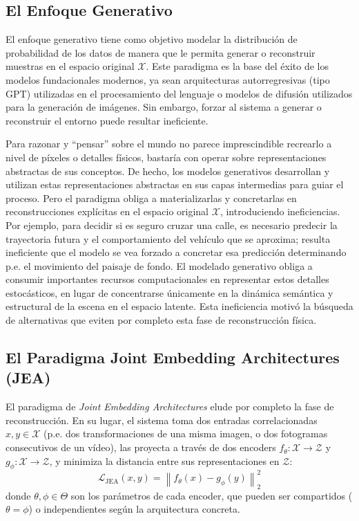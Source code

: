 \subsection{El Enfoque Generativo}
\label{subsec:generativo}
El enfoque generativo tiene como objetivo modelar la distribución de probabilidad de los datos de manera que le permita generar o reconstruir muestras en el espacio original $\mathcal{X}$. Este paradigma es la base del éxito de los modelos fundacionales modernos, ya sean arquitecturas autorregresivas (tipo GPT) utilizadas en el procesamiento del lenguaje o modelos de difusión utilizados para la generación de imágenes. Sin embargo, forzar al sistema a generar o reconstruir el entorno puede resultar ineficiente. 

Para razonar y ``pensar'' sobre el mundo no parece imprescindible recrearlo a nivel de píxeles o detalles físicos, bastaría con operar sobre representaciones abstractas de sus conceptos. De hecho, los modelos generativos desarrollan y utilizan estas representaciones abstractas en sus capas intermedias para guiar el proceso. Pero el paradigma obliga a materializarlas y concretarlas en reconstrucciones explícitas en el espacio original $\mathcal{X}$, introduciendo ineficiencias. Por ejemplo, para decidir si es seguro cruzar una calle, es necesario predecir la trayectoria futura y el comportamiento del vehículo que se aproxima; resulta ineficiente que el modelo se vea forzado a concretar esa predicción determinando p.e. el movimiento del paisaje de fondo. El modelado generativo obliga a consumir importantes recursos computacionales en representar estos detalles estocásticos, en lugar de concentrarse únicamente en la dinámica semántica y estructural de la escena en el espacio latente. Esta ineficiencia motivó la búsqueda de alternativas que eviten por completo esta fase de reconstrucción física.

\subsection{El Paradigma Joint Embedding Architectures (JEA)}
El paradigma de \textit{Joint Embedding Architectures} elude por completo la fase de reconstrucción. En su lugar, el sistema toma dos entradas correlacionadas $x, y \in \mathcal{X}$ (p.e. dos transformaciones de una misma imagen, o dos fotogramas consecutivos de un vídeo), las proyecta a través de dos encoders $f_{\theta}: \mathcal{X} \to \mathcal{Z}$ y $g_{\phi}: \mathcal{X} \to \mathcal{Z}$, y minimiza la distancia entre sus representaciones en $\mathcal{Z}$:
\begin{equation}
\mathcal{L}_{\text{JEA}}(x, y) = \left\| f_{\theta}(x) - g_{\phi}(y) \right\|_2^2
\end{equation}
donde $\theta, \phi \in \Theta$ son los parámetros de cada encoder, que pueden ser compartidos ($\theta = \phi$) o independientes según la arquitectura concreta.

